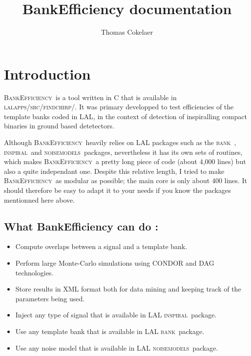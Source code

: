 \documentclass[a4paper,10pt]{article}
\title{BankEfficiency documentation}
\author{Thomas Cokelaer}
\newcommand{\insp}{\textsc{inspiral}~}
\newcommand{\bank}{\textsc{bank}~}
\newcommand{\noise}{\textsc{noisemodels}~}
\newcommand{\be}{\textsc{BankEfficiency}~}
\begin{document}

\pagestyle{plain}
\rfoot{}
\lfoot{}
\pagestyle{plain}


\noindent
\maketitle

\setcounter{tocdepth}{1}
\tableofcontents
\section{Introduction}
\be is a tool written in C that is available in \textsc{lalapps/src/findchirp/}. It was primary developped to test efficiencies of the template banks coded in LAL, in the context of detection of  inspiralling compact binaries in ground based detetectors. 

Although \be heavily relies on LAL packages such as the \bank, \insp and \noise packages, nevertheless it has its own sets of routines, which makes \be a pretty long piece of code (about 4,000 lines) but also a quite independant one.  Despite this relative length, I tried to make \be as modular as possible; the main core is only about 400 lines. It should therefore be easy to adapt it to your needs if you know the packages mentionned here above. 

\subsection*{What BankEfficiency can do :}
\begin{itemize}
 \item Compute overlaps between a signal and a template bank.
 \item Perform large Monte-Carlo simulations using \textsc{CONDOR} and \textsc{DAG} technologies.
 \item Store results in XML format both for data mining and keeping track of the parameters being used.
 \item Inject any type of signal that is available in LAL \insp package.
 \item Use any template bank that is available in LAL \bank package.
 \item Use any noise model that is available in LAL \noise package.
\end{itemize}
\end{document}
